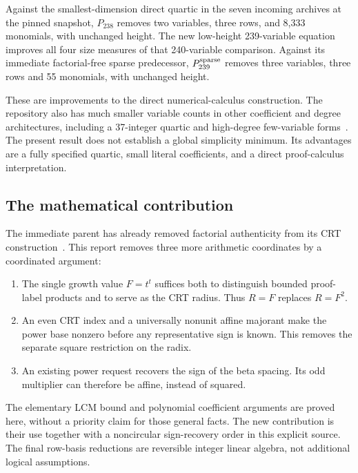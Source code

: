 \documentclass[11pt]{article}
\begin{document}
Against the smallest-dimension direct quartic in the seven incoming
archives at the pinned snapshot, $P_{238}$ removes two variables, three
rows, and 8,333 monomials, with unchanged height. The new low-height
239-variable equation improves all four size measures of that 240-variable
comparison. Against its immediate factorial-free sparse predecessor,
$P_{239}^{\rm sparse}$ removes three variables, three rows and 55 monomials,
with unchanged height.

These are improvements to the direct numerical-calculus construction.
The repository also has much smaller variable counts in other coefficient
and degree architectures, including a 37-integer quartic and high-degree
few-variable forms~\cite{repo}. The present result does not establish a
global simplicity minimum. Its advantages are a fully specified quartic,
small literal coefficients, and a direct proof-calculus interpretation.

\subsection{The mathematical contribution}

The immediate parent has already removed factorial authenticity from its
CRT construction~\cite{factorialfree}. This report removes three more
arithmetic coordinates by a coordinated argument:

\begin{enumerate}
\item The single growth value $F=t^t$ suffices both to distinguish bounded
      proof-label products and to serve as the CRT radius. Thus $R=F$
      replaces $R=F^2$.
\item An even CRT index and a universally nonunit affine majorant make the
      power base nonzero before any representative sign is known. This
      removes the separate square restriction on the radix.
\item An existing power request recovers the sign of the beta spacing.
      Its odd multiplier can therefore be affine, instead of squared.
\end{enumerate}

The elementary LCM bound and polynomial coefficient arguments are proved
here, without a priority claim for those general facts. The new contribution
is their use together with a noncircular sign-recovery order in this explicit
source. The final row-basis reductions are reversible integer linear algebra,
not additional logical assumptions.
\end{document}
